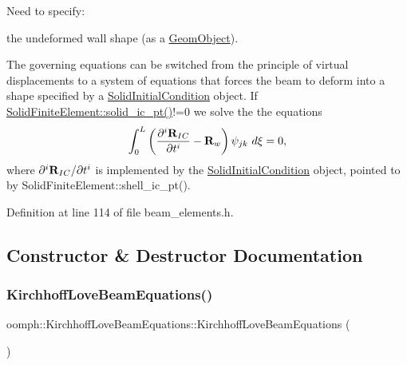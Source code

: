Need to specify\+:
\begin{DoxyItemize}
\item the undeformed wall shape (as a \hyperlink{classoomph_1_1GeomObject}{Geom\+Object}).
\end{DoxyItemize}

The governing equations can be switched from the principle of virtual displacements to a system of equations that forces the beam to deform into a shape specified by a \hyperlink{classoomph_1_1SolidInitialCondition}{Solid\+Initial\+Condition} object. If {\ttfamily \hyperlink{classoomph_1_1SolidFiniteElement_abb6ff13ecd9068e25dba4b8a63ffe5b0}{Solid\+Finite\+Element\+::solid\+\_\+ic\+\_\+pt()}!=0} we solve the the equations \[ \int_0^{L} \left( \frac{\partial^i {\bf R}_{IC}}{\partial t^i} - {\bf R}_w \right) \psi_{jk} \ d\xi = 0, \] where $ \partial^i {\bf R}_{IC}/\partial t^i$ is implemented by the \hyperlink{classoomph_1_1SolidInitialCondition}{Solid\+Initial\+Condition} object, pointed to by {\ttfamily Solid\+Finite\+Element\+::shell\+\_\+ic\+\_\+pt()}. 

Definition at line 114 of file beam\+\_\+elements.\+h.



\subsection{Constructor \& Destructor Documentation}
\mbox{\label{classoomph_1_1KirchhoffLoveBeamEquations_a1593622c70aae5fdff3a8291e76871c6}} 
\subsubsection{\texorpdfstring{Kirchhoff\+Love\+Beam\+Equations()}{KirchhoffLoveBeamEquations()}}
{\footnotesize\ttfamily oomph\+::\+Kirchhoff\+Love\+Beam\+Equations\+::\+Kirchhoff\+Love\+Beam\+Equations (\begin{DoxyParamCaption}{ }\end{DoxyParamCaption})\hspace{0.3cm}{\ttfamily [inline]}}



